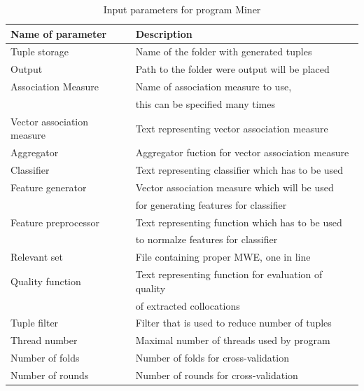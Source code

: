 \begin{table}[t]
    \centering
    \begin{tabular*}{\textwidth}{|l @{\extracolsep{\fill}} l|}
        \hline 
        \textbf{Name of parameter} & \textbf{Description} \\
        \hline
        Tuple storage & Name of the folder with generated tuples \\
        \hline
        Output & Path to the folder were output will be placed \\
        \hline
        Association Measure & Name of association measure to use, \\& this can be specified many times \\
        \hline
        Vector association measure & Text representing vector association measure \\
        \hline
        Aggregator & Aggregator fuction for vector association measure \\
        \hline
        Classifier & Text representing classifier which has to be used \\
        \hline
        Feature generator & Vector association measure which will be used \\& for generating features for classifier \\
        \hline
        Feature preprocessor & Text representing function which has to be used \\& to normalze features for classifier \\
        \hline
        Relevant set & File containing proper MWE, one in line \\
        \hline
        Quality function & Text representing function for evaluation of quality \\& of extracted collocations \\
        \hline
        Tuple filter & Filter that is used to reduce number of tuples \\
        \hline
        Thread number & Maximal number of threads used by program \\
        \hline
        Number of folds & Number of folds for cross-validation \\
        \hline
        Number of rounds & Number of rounds for cross-validation \\
        \hline
    \end{tabular*} 
    \caption{Input parameters for program Miner}
    \label{tbl_workflow1}
\end{table}

